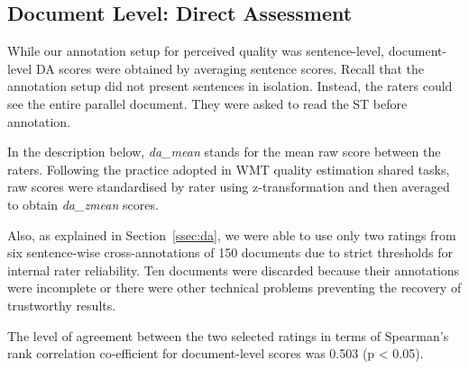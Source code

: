 

\subsection{\label{ssec:doc_da_res}Document Level: Direct Assessment}
While our annotation setup for perceived quality was sentence-level, document-level DA scores were obtained by averaging sentence scores. Recall that the annotation setup did not present sentences in isolation. Instead, the raters could see the entire parallel document. They were asked to read the ST before annotation. 

In the description below, \textit{da\_mean} stands for the mean raw score between the raters. 
Following the practice adopted in \gls{WMT} quality estimation shared tasks, raw scores were standardised by rater using z-transformation and then averaged to obtain \textit{da\_zmean} scores. %

Also, as explained in Section~\ref{ssec:da}, we were able to use only two ratings from six sentence-wise cross-annotations of 150 documents due to strict thresholds for internal rater reliability. Ten documents were discarded because their annotations were incomplete or there were other technical problems preventing the recovery of trustworthy results. 

The level of agreement between the two selected ratings in terms of Spearman's rank correlation co-efficient for document-level scores was 0.503 (p < 0.05). %

